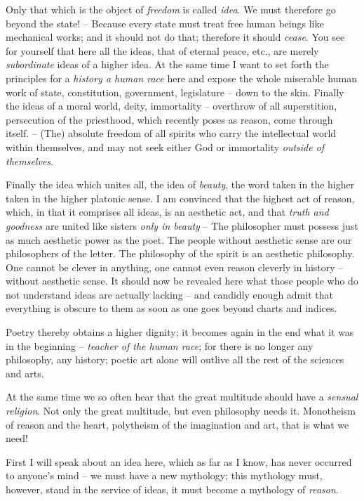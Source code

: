 \documentclass[12pt,letterpaper]{article} %
\begin{document}
Only that which is the object of \textit{freedom} is called \textit{idea}. We must therefore go beyond
the state! -- Because every state must treat free human beings like mechanical works; and it
should not do that; therefore it should \textit{cease}. You see for yourself that here all the ideas, that
of eternal peace, etc., are merely \textit{subordinate} ideas of a higher idea. At the same time I want
to set forth the principles for a \textit{history a human race} here and expose the whole miserable
human work of state, constitution, government, legislature -- down to the skin. Finally the
ideas of a moral world, deity, immortality -- overthrow of all superstition, persecution of the priesthood, which recently poses as reason, come through itself.
-- (The) absolute freedom of all spirits who carry the intellectual world within themselves,
and may not seek either God or immortality \textit{outside of themselves}.

Finally the idea which unites all, the idea of \textit{beauty}, the word taken in the higher
taken in the higher platonic sense. I am convinced that the highest act of reason, which, in
that it comprises all ideas, is an aesthetic act, and that \textit{truth and goodness} are united like
sisters \textit{only in beauty} -- The philosopher must possess just as much aesthetic power as the
poet. The people without aesthetic sense are our philosophers of the letter. The philosophy of 
the spirit is an aesthetic philosophy. One cannot be clever in anything, one cannot even
reason cleverly in history -- without aesthetic sense. It should now be revealed here what
those people who do not understand ideas are actually lacking -- and candidly enough admit
that everything is obscure to them as soon as one goes beyond charts and indices.

Poetry thereby obtains a higher dignity; it becomes again in the end what it was in the
beginning -- \textit{teacher of the human race}; for there is no longer any philosophy,
any history; poetic art alone will outlive all the rest of the sciences and arts.

At the same time we so often hear that the great multitude should have a \textit{sensual
religion}. Not only the great multitude, but even philosophy needs it. Monotheism of reason
and the heart, polytheism of the imagination and art, that is what we need!

First I will speak about an idea here, which as far as I know, has never occurred to
anyone's mind -- we must have a new mythology; this mythology must, however, stand in the
service of ideas, it must become a mythology of \textit{reason}.
\end{document}
